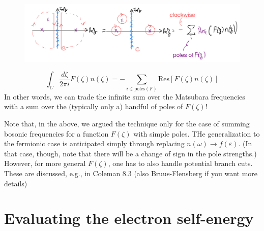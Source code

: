 \begin{figure}[H]
    \centering
    \includegraphics[width=\textwidth]{jupyterbook/data/fig/lec24-fig01.png}
\end{figure}
\[ \int_C{\frac{d\zeta}{2\pi i}F\left( \zeta \right) n\left( \zeta \right)}=-\sum_{i\in \mathrm{poles}\left( F \right)}{\mathrm{Res}\left[ F\left( \zeta \right) n\left( \zeta \right) \right]}\]
In other words, we can trade the infinite sum over the Matsubara frequencies with a sum over the (typically only a) handful of poles of $F(\zeta)$!

Note that, in the above, we argued the technique only for the case of summing bosonic frequencies for a function $F(\zeta)$ with simple poles. THe generalization to the fermionic case is anticipated simply through replacing $n(\omega)\to f(\varepsilon)$. (In that case, though, note that there will be a change of sign in the pole strengths.) However, for more general $F(\zeta)$, one has to also handle potential branch cuts. These are discussed, e.g., in Coleman 8.3 (also Bruus-Flensberg if you want more details)

\section{Evaluating the electron self-energy}

